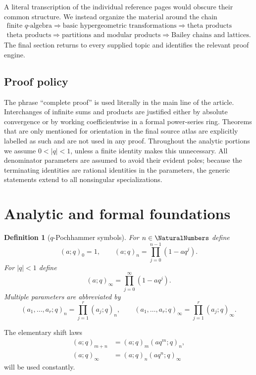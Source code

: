 \documentclass[11pt]{article}
\theoremstyle{blueplain}
\theoremstyle{bluedef}
\newtheorem{definition}[theorem]{Definition}
\begin{document}
A literal transcription of the individual reference pages would obscure their common structure. We instead organize the material around the chain
\[
\begin{gathered}
\boxed{\text{finite }q\text{-algebra}}
\Longrightarrow
\boxed{\text{basic hypergeometric transformations}}
\Longrightarrow
\boxed{\text{theta products}}\\[0.5em]
\boxed{\text{theta products}}
\Longrightarrow
\boxed{\text{partitions and modular products}}
\Longrightarrow
\boxed{\text{Bailey chains and lattices}}.
\end{gathered}
\]
The final section returns to every supplied topic and identifies the relevant proof engine.

\subsection{Proof policy}

The phrase ``complete proof'' is used literally in the main line of the article. Interchanges of infinite sums and products are justified either by absolute convergence or by working coefficientwise in a formal power-series ring. Theorems that are only mentioned for orientation in the final source atlas are explicitly labelled as such and are not used in any proof. Throughout the analytic portions we assume $0<|q|<1$, unless a finite identity makes this unnecessary. All denominator parameters are assumed to avoid their evident poles; because the terminating identities are rational identities in the parameters, the generic statements extend to all nonsingular specializations.

\section{Analytic and formal foundations}

\begin{definition}[$q$-Pochhammer symbols]
For $n\in\NaturalNumbers$ define
\[
(a;q)_0=1,\qquad (a;q)_n=\prod_{j=0}^{n-1}(1-aq^j).
\]
For $|q|<1$ define
\[
(a;q)_\infty=\prod_{j=0}^{\infty}(1-aq^j).
\]
Multiple parameters are abbreviated by
\[
(a_1,\ldots,a_r;q)_n=\prod_{j=1}^r(a_j;q)_n,
\qquad
(a_1,\ldots,a_r;q)_\infty=\prod_{j=1}^r(a_j;q)_\infty.
\]
\end{definition}

The elementary shift laws
\begin{align}
(a;q)_{m+n}&=(a;q)_m(aq^m;q)_n, \label{eq:shift-finite}\\
(a;q)_\infty&=(a;q)_n(aq^n;q)_\infty \label{eq:shift-infinite}
\end{align}
will be used constantly.
\end{document}
